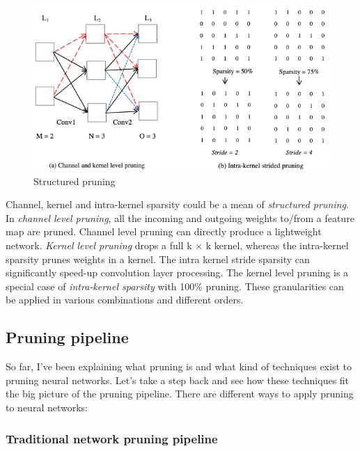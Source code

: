 \begin{figure}[ht]
    \includegraphics[width=\textwidth]{images/pruning/structured_pruning.png}
    \centering
    \caption{Structured pruning}\label{fig:structured_pruning}
\end{figure}

Channel, kernel and intra-kernel sparsity could be a mean of \textit{structured
pruning}. In \textit{channel level pruning}, all the incoming and outgoing
weights to/from a feature map are pruned. Channel level pruning can directly
produce a lightweight network.
\textit{Kernel level pruning} drops a full k × k kernel, whereas the
intra-kernel sparsity prunes weights in a kernel. The intra kernel stride
sparsity can significantly speed-up convolution layer processing.
The kernel level pruning is a special case of \textit{intra-kernel sparsity}
with 100\% pruning. These granularities can be applied in various combinations
and different orders.\cite{Anwar_2017}

\subsection{Pruning pipeline}
So far, I've been explaining what pruning is and what kind of techniques exist
to pruning neural networks. Let's take a step back and see how these techniques
fit the big picture of the pruning pipeline.
There are different ways to apply pruning to neural networks:

\subsubsection{Traditional network pruning pipeline}

